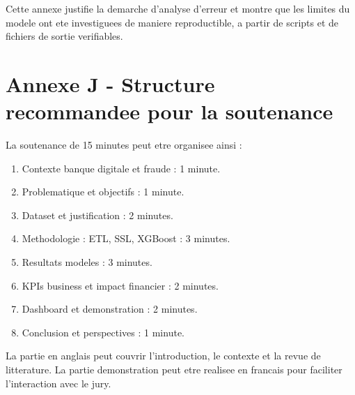 ﻿\documentclass[12pt,a4paper,oneside]{report}
\begin{document}
Cette annexe justifie la demarche d'analyse d'erreur et montre que les limites du modele ont ete investiguees de maniere reproductible, a partir de scripts et de fichiers de sortie verifiables.

\chapter{Annexe J - Structure recommandee pour la soutenance}

La soutenance de 15 minutes peut etre organisee ainsi :

\begin{enumerate}
    \item Contexte banque digitale et fraude : 1 minute.
    \item Problematique et objectifs : 1 minute.
    \item Dataset et justification : 2 minutes.
    \item Methodologie : ETL, SSL, XGBoost : 3 minutes.
    \item Resultats modeles : 3 minutes.
    \item KPIs business et impact financier : 2 minutes.
    \item Dashboard et demonstration : 2 minutes.
    \item Conclusion et perspectives : 1 minute.
\end{enumerate}

La partie en anglais peut couvrir l'introduction, le contexte et la revue de litterature. La partie demonstration peut etre realisee en francais pour faciliter l'interaction avec le jury.
\end{document}
